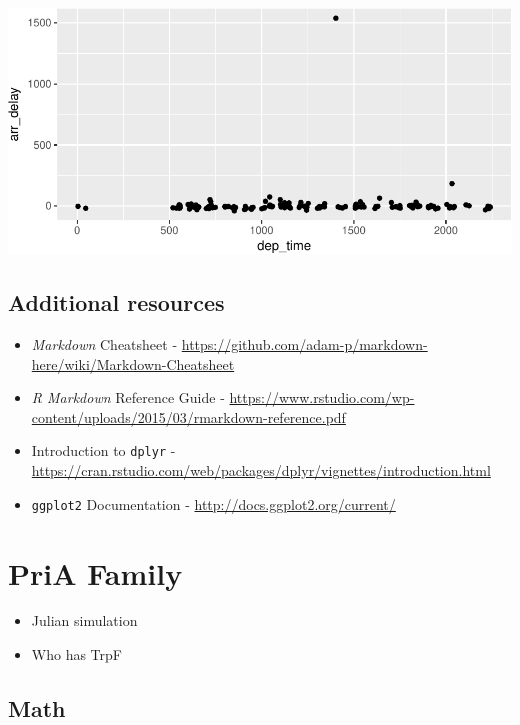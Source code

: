 \documentclass[12pt,twoside]{reedthesis}
\providecommand{\tightlist}{%
  \setlength{\itemsep}{0pt}\setlength{\parskip}{0pt}}
\begin{document}
  \begin{center}\includegraphics{tesis_files/figure-latex/march3plot-1} \end{center}
  
  \section{Additional resources}\label{additional-resources}
  
  \begin{itemize}
  \item
    \emph{Markdown} Cheatsheet -
    \url{https://github.com/adam-p/markdown-here/wiki/Markdown-Cheatsheet}
  \item
    \emph{R Markdown} Reference Guide -
    \url{https://www.rstudio.com/wp-content/uploads/2015/03/rmarkdown-reference.pdf}
  \item
    Introduction to \texttt{dplyr} -
    \url{https://cran.rstudio.com/web/packages/dplyr/vignettes/introduction.html}
  \item
    \texttt{ggplot2} Documentation -
    \url{http://docs.ggplot2.org/current/}
  \end{itemize}
  
  \chapter{PriA Family}\label{math-sci}
  
  \begin{itemize}
  \tightlist
  \item
    Julian simulation
  \item
    Who has TrpF
  \end{itemize}
  
  \hypertarget{math}{\section{Math}\label{math}}
  
\end{document}
